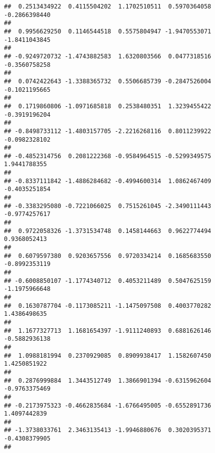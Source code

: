\documentclass[]{article}
\begin{document}
\begin{verbatim}
##  0.2513434922  0.4115504202  1.1702510511  0.5970364058 -0.2866398440 
##                                                                       
##  0.9956629250  0.1146544518  0.5575804947 -1.9470553071 -1.8411043845 
##                                                                       
## -0.9249720732 -1.4743882583  1.6320803566  0.0477318516 -0.3560758258 
##                                                                       
##  0.0742422643 -1.3388365732  0.5506685739 -0.2847526004 -0.1021195665 
##                                                                       
##  0.1719860806 -1.0971685818  0.2538480351  1.3239455422 -0.3919196204 
##                                                                       
## -0.8498733112 -1.4803157705 -2.2216268116  0.8011239922 -0.0982328102 
##                                                                       
## -0.4852314756  0.2081222368 -0.9584964515 -0.5299349575  1.9441788355 
##                                                                       
## -0.8337111842 -1.4886284682 -0.4994600314  1.0862467409 -0.4035251854 
##                                                                       
## -0.3383295080 -0.7221066025  0.7515261045 -2.3490111443 -0.9774257617 
##                                                                       
##  0.9722058326 -1.3731534748  0.1458144663  0.9622774494  0.9368052413 
##                                                                       
##  0.6079597380  0.9203657556  0.9720334214  0.1685683550 -0.8992353119 
##                                                                       
## -0.6008850107 -1.1774340712  0.4053211489  0.5047625159 -1.1975966648 
##                                                                       
##  0.1630787704 -0.1173085211 -1.1475097508  0.4003770282  1.4386498635 
##                                                                       
##  1.1677327713  1.1681654397 -1.9111240893  0.6881626146 -0.5882936138 
##                                                                       
##  1.0988181994  0.2370929085  0.8909938417  1.1582607450  1.4250851922 
##                                                                       
##  0.2876999884  1.3443512749  1.3866901394 -0.6315962604 -0.9763375469 
##                                                                       
## -0.2173975323 -0.4662835684 -1.6766495005 -0.6552891736  1.4097442839 
##                                                                       
## -1.3738033761  2.3463135413 -1.9946880676  0.3020395371 -0.4308379905 
##                                                                       

\end{verbatim}
\end{document}
